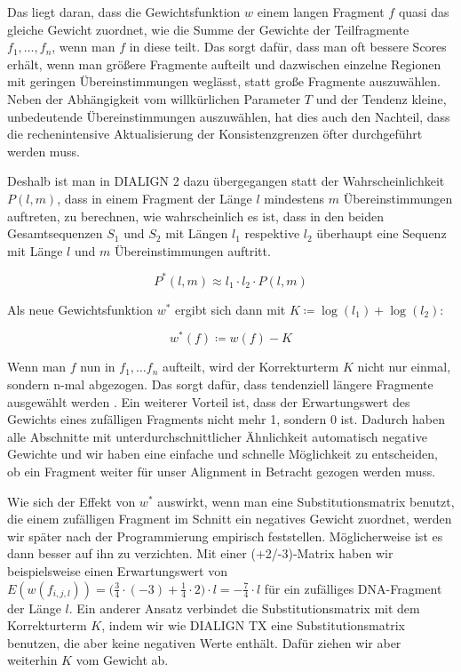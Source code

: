 Das liegt daran, dass die Gewichtsfunktion $w$ einem langen Fragment $f$ quasi das gleiche Gewicht zuordnet, wie die Summe der Gewichte der Teilfragmente $f_1, \dots, f_n$, wenn man $f$ in diese teilt. Das sorgt dafür, dass man oft bessere Scores erhält, wenn man größere Fragmente aufteilt und dazwischen einzelne Regionen mit geringen Übereinstimmungen weglässt, statt große Fragmente auszuwählen. Neben der Abhängigkeit vom willkürlichen Parameter $T$ und der Tendenz kleine, unbedeutende Übereinstimmungen auszuwählen, hat dies auch den Nachteil, dass die rechenintensive Aktualisierung der Konsistenzgrenzen öfter durchgeführt werden muss. 

Deshalb ist man in DIALIGN 2 dazu übergegangen statt der Wahrscheinlichkeit $P(l,m)$, dass in einem Fragment der Länge $l$ mindestens $m$ Übereinstimmungen auftreten, zu berechnen, wie wahrscheinlich es ist, dass in den beiden Gesamtsequenzen $S_1$ und $S_2$ mit Längen $l_1$ respektive $l_2$ überhaupt eine Sequenz mit Länge $l$ und $m$ Übereinstimmungen auftritt. 

\begin{equation}
	P^*(l,m) \approx l_1\cdot l_2\cdot P(l,m)
\end{equation}

Als neue Gewichtsfunktion $w^*$ ergibt sich dann mit $K \coloneqq \log(l_1) + \log(l_2)$:

\begin{equation}
	w^*(f) \coloneqq w(f) - K
\end{equation}

Wenn man $f$ nun in $f_1, \dots f_n$ aufteilt, wird der Korrekturterm $K$ nicht nur einmal, sondern n-mal abgezogen. Das sorgt dafür, dass tendenziell längere Fragmente ausgewählt werden \citep{m99}. Ein weiterer Vorteil ist, dass der Erwartungswert des Gewichts eines zufälligen Fragments nicht mehr 1, sondern 0 ist. Dadurch haben alle Abschnitte mit unterdurchschnittlicher Ähnlichkeit automatisch negative Gewichte und wir haben eine einfache und schnelle Möglichkeit zu entscheiden, ob ein Fragment weiter für unser Alignment in Betracht gezogen werden muss.

Wie sich der Effekt von $w^*$ auswirkt, wenn man eine Substitutionsmatrix benutzt, die einem zufälligen Fragment im Schnitt ein negatives Gewicht zuordnet, werden wir später nach der Programmierung empirisch feststellen. Möglicherweise ist es dann besser auf ihn zu verzichten. Mit einer (+2/-3)-Matrix haben wir beispielsweise einen Erwartungswert von $E(w(f_{i,j,l})) = \big( \frac{3}{4}\cdot(-3) + \frac{1}{4}\cdot2 \big) \cdot l = -\frac{7}{4}\cdot l$ für ein zufälliges DNA-Fragment der Länge $l$. Ein anderer Ansatz verbindet die Substitutionsmatrix mit dem Korrekturterm $K$, indem wir wie DIALIGN TX eine Substitutionsmatrix benutzen, die aber keine negativen Werte enthält. Dafür ziehen wir aber weiterhin $K$ vom Gewicht ab.
 
